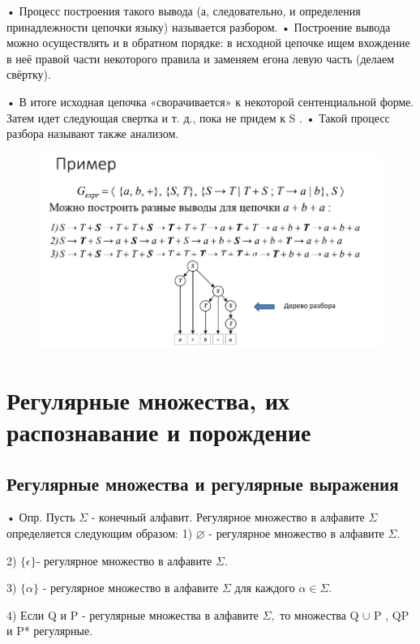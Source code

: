 \documentclass{article}
\begin{document}
• Процесс построения такого вывода (а, следовательно, и определения
принадлежности цепочки языку) называется разбором.
• Построение вывода можно осуществлять и в обратном порядке: в исходной
цепочке ищем вхождение в неё правой части некоторого правила и заменяем
егона левую часть (делаем свёртку).

• В итоге исходная цепочка «сворачивается» к некоторой сентенциальной
форме. Затем идет следующая свертка и т. д., пока не придем к S .
• Такой процесс разбора называют также анализом.

\begin{figure}[H]
    \centering
    \includegraphics[width=1\linewidth]{Снимок экрана 2025-02-27 084444.png}
\end{figure}

\section{Регулярные множества, их распознавание и порождение}

\subsection{Регулярные множества и регулярные выражения}

• Опр. Пусть $\Sigma$ - конечный алфавит. Регулярное множество в
алфавите $\Sigma$ определяется следующим образом:
1) $\varnothing$ - регулярное множество в алфавите $\Sigma$.

2) $\{\epsilon\} $- регулярное множество в алфавите $\Sigma$.

3) $\{\alpha\}$ - регулярное множество в алфавите $\Sigma$ для каждого $\alpha \in  \Sigma$.

4) Если Q и P - регулярные множества в алфавите $\Sigma,$ то множества
Q $\cup$ P , QP и P* регулярные.
\end{document}
